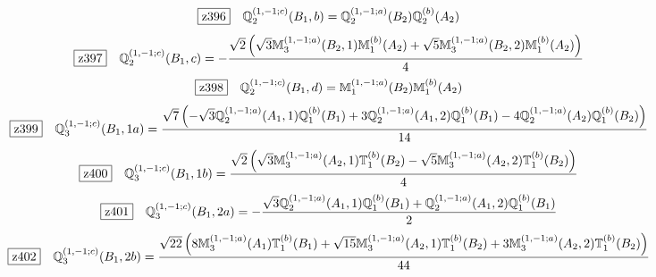 \documentclass[fleqn,10pt,landscape]{jsarticle}
\begin{document}
\begin{dmath*}
\hspace*{3mm}\fbox{z396}\quad \mathbb{Q}_{2}^{(1,-1;c)}(B_{1},b)=\mathbb{Q}_{2}^{(1,-1;a)}(B_{2}) \mathbb{Q}_{2}^{(b)}(A_{2})
\end{dmath*}
\begin{dmath*}
\hspace*{3mm}\fbox{z397}\quad \mathbb{Q}_{2}^{(1,-1;c)}(B_{1},c)=- \frac{\sqrt{2} \left(\sqrt{3} \mathbb{M}_{3}^{(1,-1;a)}(B_{2},1) \mathbb{M}_{1}^{(b)}(A_{2}) + \sqrt{5} \mathbb{M}_{3}^{(1,-1;a)}(B_{2},2) \mathbb{M}_{1}^{(b)}(A_{2})\right)}{4}
\end{dmath*}
\begin{dmath*}
\hspace*{3mm}\fbox{z398}\quad \mathbb{Q}_{2}^{(1,-1;c)}(B_{1},d)=\mathbb{M}_{1}^{(1,-1;a)}(B_{2}) \mathbb{M}_{1}^{(b)}(A_{2})
\end{dmath*}
\begin{dmath*}
\hspace*{3mm}\fbox{z399}\quad \mathbb{Q}_{3}^{(1,-1;c)}(B_{1},1a)=\frac{\sqrt{7} \left(- \sqrt{3} \mathbb{Q}_{2}^{(1,-1;a)}(A_{1},1) \mathbb{Q}_{1}^{(b)}(B_{1}) + 3 \mathbb{Q}_{2}^{(1,-1;a)}(A_{1},2) \mathbb{Q}_{1}^{(b)}(B_{1}) - 4 \mathbb{Q}_{2}^{(1,-1;a)}(A_{2}) \mathbb{Q}_{1}^{(b)}(B_{2})\right)}{14}
\end{dmath*}
\begin{dmath*}
\hspace*{3mm}\fbox{z400}\quad \mathbb{Q}_{3}^{(1,-1;c)}(B_{1},1b)=\frac{\sqrt{2} \left(\sqrt{3} \mathbb{M}_{3}^{(1,-1;a)}(A_{2},1) \mathbb{T}_{1}^{(b)}(B_{2}) - \sqrt{5} \mathbb{M}_{3}^{(1,-1;a)}(A_{2},2) \mathbb{T}_{1}^{(b)}(B_{2})\right)}{4}
\end{dmath*}
\begin{dmath*}
\hspace*{3mm}\fbox{z401}\quad \mathbb{Q}_{3}^{(1,-1;c)}(B_{1},2a)=- \frac{\sqrt{3} \mathbb{Q}_{2}^{(1,-1;a)}(A_{1},1) \mathbb{Q}_{1}^{(b)}(B_{1}) + \mathbb{Q}_{2}^{(1,-1;a)}(A_{1},2) \mathbb{Q}_{1}^{(b)}(B_{1})}{2}
\end{dmath*}
\begin{dmath*}
\hspace*{3mm}\fbox{z402}\quad \mathbb{Q}_{3}^{(1,-1;c)}(B_{1},2b)=\frac{\sqrt{22} \left(8 \mathbb{M}_{3}^{(1,-1;a)}(A_{1}) \mathbb{T}_{1}^{(b)}(B_{1}) + \sqrt{15} \mathbb{M}_{3}^{(1,-1;a)}(A_{2},1) \mathbb{T}_{1}^{(b)}(B_{2}) + 3 \mathbb{M}_{3}^{(1,-1;a)}(A_{2},2) \mathbb{T}_{1}^{(b)}(B_{2})\right)}{44}
\end{dmath*}
\end{document}
